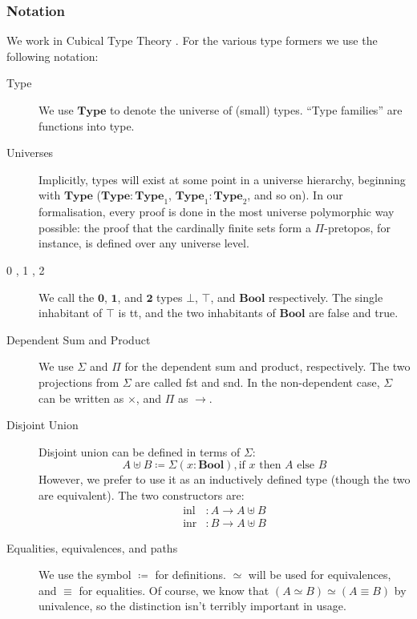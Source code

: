 \subsubsection{Notation}
We work in Cubical Type Theory \cite{cohenCubicalTypeTheory2016}.
For the various type formers we use the following notation:
\begin{description}
  \item[Type] We use \(\mathbf{Type}\) to denote the universe of (small) types.
    ``Type families'' are functions into type.
  \item[Universes]
    Implicitly, types will exist at some point in a universe hierarchy,
    beginning with \(\mathbf{Type}\) (\(\mathbf{Type} : \mathbf{Type}_1\),
    \(\mathbf{Type}_1 : \mathbf{Type}_2\), and so on).
    In our formalisation, every proof is done in the most universe polymorphic
    way possible: the proof that the cardinally finite sets form a
    \(\Pi\)-pretopos, for instance, is defined over any universe level.
  \item[0 , 1 , 2] We call the \(\mathbf{0}\), \(\mathbf{1}\), and
    \(\mathbf{2}\) types \(\bot\), \(\top\), and \(\mathbf{Bool}\) respectively.
    The single inhabitant of \(\top\) is tt, and the two inhabitants of
    \(\mathbf{Bool}\) are false and true.
  \item[Dependent Sum and Product] We use \(\Sigma\) and \(\Pi\) for the
    dependent sum and product, respectively.
    The two projections from \(\Sigma\) are called fst and snd.
    In the non-dependent case, \(\Sigma\) can be written as \(\times\), and
    \(\Pi\) as \(\rightarrow\).
  \item[Disjoint Union] Disjoint union can be defined in terms of \(\Sigma\):
    \begin{equation}
      A \uplus B \coloneqq \Sigma(x : \mathbf{Bool}) , \text{if } x \text{ then } A \text{ else } B
    \end{equation}
    However, we prefer to use it as an inductively defined type (though the two
    are equivalent).
    The two constructors are:
    \begin{equation}
      \begin{aligned}
        \text{inl} &: A \rightarrow A \uplus B \\
        \text{inr} &: B \rightarrow A \uplus B
      \end{aligned}
    \end{equation}
  \item[Equalities, equivalences, and paths] We use the symbol \(\coloneqq\)
    for definitions.
    \(\simeq\) will be used for equivalences, and \(\equiv\) for equalities.
    Of course, we know that \((A \simeq B) \simeq (A \equiv B)\) by univalence,
    so the distinction isn't terribly important in usage.
\end{description}
